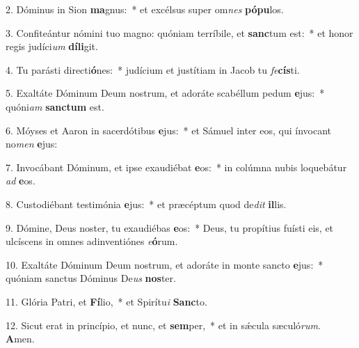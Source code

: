 2. Dóminus in Sion \textbf{ma}gnus:~*  et excélsus super om\textit{nes} \textbf{pó}\textbf{pu}los.\

3. Confiteántur nómini tuo magno: quóniam terríbile, et \textbf{sanc}tum est:~*  et honor regis judíci\textit{um} \textbf{dí}\textbf{li}git.\

4. Tu parásti directi\textbf{ó}nes:~*  judícium et justítiam in Jacob tu \textit{fe}\textbf{cís}ti.\

5. Exaltáte Dóminum Deum nostrum, et adoráte scabéllum pedum \textbf{e}jus:~*  quóni\textit{am} \textbf{sanc}\textbf{tum} est.\

6. Móyses et Aaron in sacerdótibus \textbf{e}jus:~*  et Sámuel inter eos, qui ínvocant no\textit{men} \textbf{e}jus:\

7. Invocábant Dóminum, et ipse exaudiébat \textbf{e}os:~*  in colúmna nubis loquebátur \textit{ad} \textbf{e}os.\

8. Custodiébant testimónia \textbf{e}jus:~*  et præcéptum quod de\textit{dit} \textbf{il}lis.\

9. Dómine, Deus noster, tu exaudiébas \textbf{e}os:~*  Deus, tu propítius fuísti eis, et ulcíscens in omnes adinventiónes \textit{e}\textbf{ó}rum.\

10. Exaltáte Dóminum Deum nostrum, et adoráte in monte sancto \textbf{e}jus:~*  quóniam sanctus Dóminus De\textit{us} \textbf{nos}ter.\

11. Glória Patri, et \textbf{Fí}lio,~*  et Spirítu\textit{i} \textbf{Sanc}to.\

12. Sicut erat in princípio, et nunc, et \textbf{sem}per,~*  et in sǽcula sæculó\textit{rum}. \textbf{A}men.\

